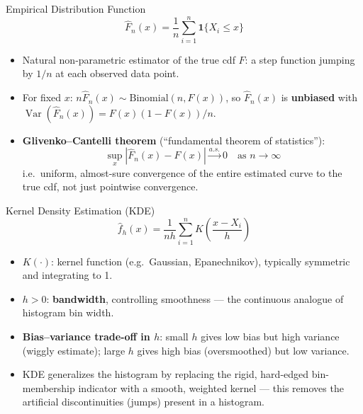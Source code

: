 \documentclass[11pt,aspectratio=169]{beamer}
\newcommand{\Var}{\operatorname{Var}}
\begin{document}
\begin{frame}{Empirical Distribution Function}
\[
    \hat F_n(x)=\frac1n\sum_{i=1}^n \mathbf 1\{X_i\le x\}
\]
\begin{itemize}
    \item Natural non-parametric estimator of the true cdf $F$: a step
          function jumping by $1/n$ at each observed data point.
    \item For fixed $x$: $n\hat F_n(x)\sim \text{Binomial}(n,F(x))$, so
          $\hat F_n(x)$ is \textbf{unbiased} with
          $\Var(\hat F_n(x))=F(x)(1-F(x))/n$.
    \item \textbf{Glivenko--Cantelli theorem} (``fundamental theorem of
          statistics''):
    \[
        \sup_x |\hat F_n(x)-F(x)| \xrightarrow{a.s.} 0 \quad\text{as } n\to\infty
    \]
    i.e.\ uniform, almost-sure convergence of the entire estimated curve to
    the true cdf, not just pointwise convergence.
\end{itemize}
\end{frame}

\begin{frame}{Kernel Density Estimation (KDE)}
\[
    \hat f_h(x)=\frac{1}{nh}\sum_{i=1}^n K\!\left(\frac{x-X_i}{h}\right)
\]
\begin{itemize}
    \item $K(\cdot)$: kernel function (e.g.\ Gaussian, Epanechnikov),
          typically symmetric and integrating to 1.
    \item $h>0$: \textbf{bandwidth}, controlling smoothness — the
          continuous analogue of histogram bin width.
    \item \textbf{Bias--variance trade-off in $h$}: small $h$ gives low bias
          but high variance (wiggly estimate); large $h$ gives high bias
          (oversmoothed) but low variance.
    \item KDE generalizes the histogram by replacing the rigid, hard-edged
          bin-membership indicator with a smooth, weighted kernel — this
          removes the artificial discontinuities (jumps) present in a
          histogram.
\end{itemize}
\end{frame}
\end{document}
